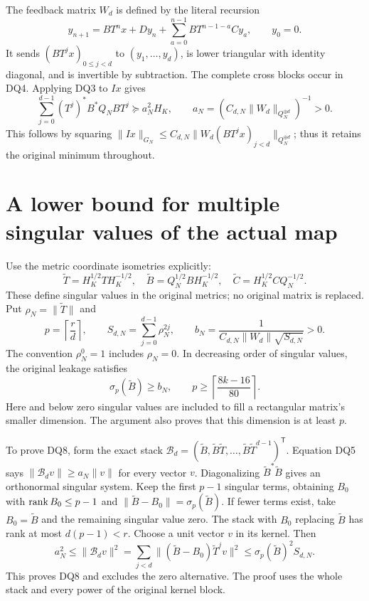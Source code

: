 The feedback matrix $W_d$ is defined by the literal recursion
\[
 y_{n+1}=BT^nx+Dy_n+\sum_{a=0}^{n-1}BT^{n-1-a}Cy_a,
 \qquad y_0=0.\tag{DQ4}
\]
It sends $(BT^jx)_{0\le j<d}$ to $(y_1,\ldots,y_d)$, is lower
triangular with identity diagonal, and is invertible by subtraction.
The complete cross blocks occur in DQ4. Applying DQ3 to $Ix$ gives
\[
 \sum_{j=0}^{d-1}(T^j)^*B^*Q_NBT^j
 \succeq a_N^2H_K,
 \qquad a_N=(C_{d,N}\|W_d\|_{Q_N^{\oplus d}})^{-1}>0.
 \tag{DQ5}
\]
This follows by squaring
$\|Ix\|_{G_N}\le C_{d,N}\|W_d(BT^jx)_{j<d}\|_{Q_N^{\oplus d}}$;
thus it retains the original minimum throughout.

\section{A lower bound for multiple singular values of the actual map}
Use the metric coordinate isometries explicitly:
\[
 \widetilde T=H_K^{1/2}TH_K^{-1/2},\quad
 \widetilde B=Q_N^{1/2}BH_K^{-1/2},\quad
 \widetilde C=H_K^{1/2}CQ_N^{-1/2}.
 \tag{DQ6}
\]
These define singular values in the original metrics; no original matrix
is replaced. Put $\rho_N=\|\widetilde T\|$ and
\[
 p=\left\lceil\frac rd\right\rceil,\qquad
 S_{d,N}=\sum_{j=0}^{d-1}\rho_N^{2j},\qquad
 b_N=\frac{1}{C_{d,N}\|W_d\|\sqrt{S_{d,N}}}>0.
 \tag{DQ7}
\]
The convention $\rho_N^0=1$ includes $\rho_N=0$. In decreasing
order of singular values, the original leakage satisfies
\[
 \boxed{\sigma_p(\widetilde B)\ge b_N,
 \qquad p\ge\left\lceil\frac{8k-16}{80}\right\rceil.}
 \tag{DQ8}
\]
Here and below zero singular values are included to fill a rectangular
matrix's smaller dimension. The argument also proves that this dimension
is at least $p$.

To prove DQ8, form the exact stack
$\mathcal B_d=(\widetilde B,\widetilde B\widetilde T,\ldots,
\widetilde B\widetilde T^{d-1})^{\mathsf T}$. Equation DQ5 says
$\|\mathcal B_dv\|\ge a_N\|v\|$ for every vector $v$.
Diagonalizing $\widetilde B^*\widetilde B$ gives an orthonormal
singular system. Keep the first $p-1$ singular terms, obtaining $B_0$
with $\operatorname{rank} B_0\le p-1$ and
$\|\widetilde B-B_0\|=\sigma_p(\widetilde B)$.
If fewer terms exist, take $B_0=\widetilde B$ and the remaining
singular value zero. The stack with $B_0$ replacing $\widetilde B$
has rank at most $d(p-1)<r$. Choose a unit vector $v$ in its kernel.
Then
\[
 a_N^2\le\|\mathcal B_dv\|^2
 =\sum_{j<d}\|(\widetilde B-B_0)\widetilde T^jv\|^2
 \le\sigma_p(\widetilde B)^2 S_{d,N}.
 \tag{DQ9}
\]
This proves DQ8 and excludes the zero alternative. The proof uses the
whole stack and every power of the original kernel block.

